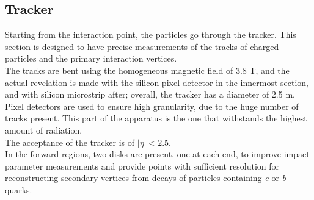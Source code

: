 \subsection{Tracker}
Starting from the interaction point, the particles go through the tracker. This section is designed to have precise measurements of the tracks of charged particles and the primary interaction vertices.\\
The tracks are bent using the homogeneous magnetic field of 3.8 T, and the actual revelation is made with the silicon pixel detector in the innermost section, and with silicon microstrip after; overall, the tracker has a diameter of 2.5 m.\\
Pixel detectors are used to ensure high granularity, due to the huge number of tracks present.
This part of the apparatus is the one that withstands the highest amount of radiation.\\
The acceptance of the tracker is of $|\eta|<2.5$.\\
In the forward regions, two disks are present, one at each end, to improve impact parameter measurements and provide points with sufficient resolution for reconstructing secondary vertices from decays of particles containing \emph{c} or \emph{b} quarks.
